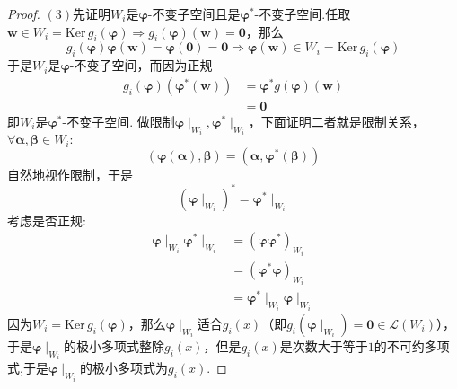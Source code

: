 {\begin{proof}
        $(3)$先证明$W_i$是$\bm{\varphi}$-不变子空间且是$\bm{\varphi}^*$-不变子空间.任取$\bm{w}\in W_i=\mathrm{Ker}\,g_i\left(\bm{\varphi}\right)\Longrightarrow g_i\left(\bm{\varphi}\right)\left(\bm{w}\right)=\bm{0}$，那么\[
            g_i\left(
            \bm{\varphi}
            \right)\bm{\varphi}\left(\bm{w}\right)=\bm{\varphi}\left(\bm{0}\right)=\bm{0}\Longrightarrow\bm{\varphi}\left(\bm{w}\right)\in W_i=\mathrm{Ker}\,g_i\left(\bm{\varphi}\right)
        \]于是$W_i$是$\bm{\varphi}$-不变子空间，而因为正规\begin{align*}
            g_i\left(\bm{\varphi}\right)\left(
            \bm{\varphi}^*\left(\bm{w}\right)
            \right) & =\bm{\varphi}^*g\left(
            \bm{\varphi}
            \right)\left(\bm{w}\right)       \\
                    & =\bm{0}
        \end{align*}
        即$W_i$是$\bm{\varphi}^*$-不变子空间.
        做限制$\bm{\varphi}\mid_{W_i},\bm{\varphi}^*\mid_{W_i}$，下面证明二者就是限制关系，$\forall\bm{\alpha},\bm{\beta}\in W_i:$\[
            \left(
            \bm{\varphi}\left(
                \bm{\alpha}
                \right),\bm{\beta}
            \right)=\left(
            \bm{\alpha},\bm{\varphi}^*\left(
                \bm{\beta}
                \right)
            \right)
        \]自然地视作限制，于是\[
            \left(
            \bm{\varphi}\mid_{W_i}
            \right)^*=\bm{\varphi}^*\mid_{W_i}
        \]考虑是否正规:\begin{align*}
            \bm{\varphi}\mid_{W_i}\bm{\varphi}^*\mid_{W_i} & =\left(
            \bm{\varphi}\bm{\varphi}^*
            \right)_{W_i}                                                                                    \\
                                                           & =\left(
            \bm{\varphi}^*\bm{\varphi}
            \right)_{W_i}                                                                                    \\
                                                           & =\bm{\varphi}^*\mid_{W_i}\bm{\varphi}\mid_{W_i}
        \end{align*}因为$W_i=\mathrm{Ker}\,g_i\left(\bm{\varphi}\right)$，那么$\bm{\varphi}\mid_{W_i}$适合$g_i\left(x\right)$（即$g_i\left(\bm{\varphi}\mid_{W_i}\right)=\bm{0}\in\mathcal{L}\left(W_i\right)$），于是$\bm{\varphi}\mid_{W_i}$的极小多项式整除$g_i\left(x\right)$，但是$g_i\left(x\right)$是次数大于等于$1$的不可约多项式,于是$\bm{\varphi}\mid_{W_i}$的极小多项式为$g_i\left(x\right)$.
    \end{proof}
}
